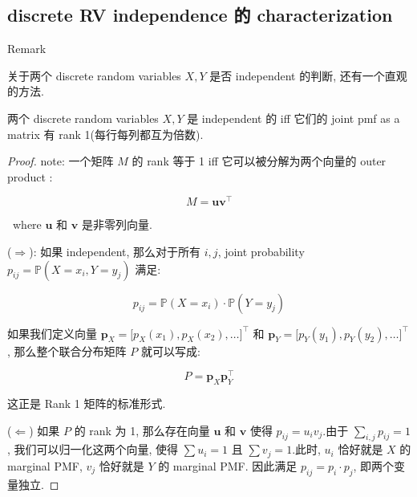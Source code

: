 \subsection{discrete RV independence 的 characterization}\label{discrete-rv-independence-ux7684-characterization}

\begin{qlremark}{Remark}

关于两个 discrete random variables \(\mathit{X},\mathit{Y}\) 是否 independent 的判断, 还有一个直观的方法.

\begin{proposition}{}

两个 discrete random variables \(\mathit{X},\mathit{Y}\) 是 independent 的 iff 它们的 joint pmf as a matrix 有 rank 1(每行每列都互为倍数).

\end{proposition}

\begin{proof}

note: 一个矩阵 \(\mathit{M}\) 的 rank 等于 1 iff 它可以被分解为两个向量的 outer product :

\[\mathit{M} = \mathbf{u}\mathbf{v}^{\top}\]

~where \(\mathbf{u}\) 和 \(\mathbf{v}\) 是非零列向量.

(\(\Longrightarrow\)): 如果 independent, 那么对于所有 \(\mathit{i},\mathit{j}\), joint probability \(\mathit{p}_{\mathit{i}\mathit{j}} = \mathbb{P}(\mathit{X} = \mathit{x}_{\mathit{i}},\mathit{Y} = \mathit{y}_{\mathit{j}})\) 满足:

\[\mathit{p}_{\mathit{i}\mathit{j}} = \mathbb{P}(\mathit{X} = \mathit{x}_{\mathit{i}}) \cdot \mathbb{P}(\mathit{Y} = \mathit{y}_{\mathit{j}})\]

如果我们定义向量 \(\mathbf{p}_{\mathit{X}} = \lbrack\mathit{p}_{\mathit{X}}(\mathit{x}_{1}),\mathit{p}_{\mathit{X}}(\mathit{x}_{2}),\ldots\rbrack^{\top}\) 和 \(\mathbf{p}_{\mathit{Y}} = \lbrack\mathit{p}_{\mathit{Y}}(\mathit{y}_{1}),\mathit{p}_{\mathit{Y}}(\mathit{y}_{2}),\ldots\rbrack^{\top}\), 那么整个联合分布矩阵 \(\mathit{P}\) 就可以写成:

\[\mathit{P} = \mathbf{p}_{\mathit{X}}\mathbf{p}_{\mathit{Y}}^{\top}\]

这正是 Rank 1 矩阵的标准形式.

(\(\Longleftarrow\)) 如果 \(\mathit{P}\) 的 rank 为 1, 那么存在向量 \(\mathbf{u}\) 和 \(\mathbf{v}\) 使得 \(\mathit{p}_{\mathit{i}\mathit{j}} = \mathit{u}_{\mathit{i}}\mathit{v}_{\mathit{j}}\).由于 \(\sum_{\mathit{i},\mathit{j}}\mathit{p}_{\mathit{i}\mathit{j}} = 1\), 我们可以归一化这两个向量, 使得 \(\sum\mathit{u}_{\mathit{i}} = 1\) 且 \(\sum\mathit{v}_{\mathit{j}} = 1\).此时, \(\mathit{u}_{\mathit{i}}\) 恰好就是 \(\mathit{X}\) 的 marginal PMF, \(\mathit{v}_{\mathit{j}}\) 恰好就是 \(\mathit{Y}\) 的 marginal PMF. 因此满足 \(\mathit{p}_{\mathit{i}\mathit{j}} = \mathit{p}_{\mathit{i}} \cdot \mathit{p}_{\mathit{j}}\), 即两个变量独立.


\end{proof}
\end{qlremark}
